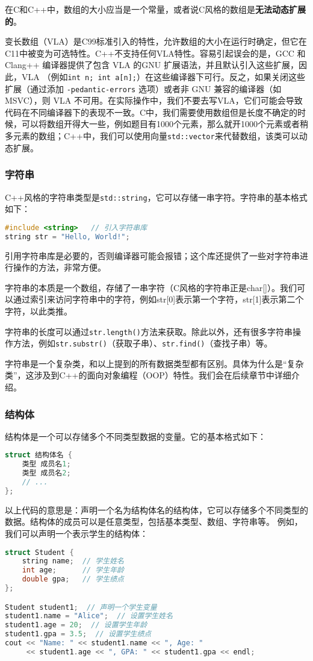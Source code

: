 \documentclass[../main.tex]{subfiles}
\begin{document}
在C和C++中，数组的大小应当是一个常量，或者说C风格的数组是\textbf{无法动态扩展的}。

\begin{caution}
  变长数组（VLA）是C99标准引入的特性，允许数组的大小在运行时确定，但它在C11中被变为可选特性。C++不支持任何VLA特性。容易引起误会的是，GCC 和 Clang++ 编译器提供了包含 VLA 的GNU 扩展语法，并且默认引入这些扩展，因此，VLA （例如\texttt{int n; int a[n];}）在这些编译器下可行。反之，如果关闭这些扩展（通过添加 \texttt{-pedantic-errors} 选项）或者非 GNU 兼容的编译器（如 MSVC），则 VLA 不可用。在实际操作中，我们不要去写VLA，它们可能会导致代码在不同编译器下的表现不一致。C中，我们需要使用数组但是长度不确定的时候，可以将数组开得大一些，例如题目有1000个元素，那么就开1000个元素或者稍多元素的数组；C++中，我们可以使用向量\texttt{std::vector}来代替数组，该类可以动态扩展。
\end{caution}

\subsubsection{字符串}
C++风格的字符串类型是\texttt{std::string}，它可以存储一串字符。字符串的基本格式如下：
\begin{lstlisting}[language=C++]
#include <string>   // 引入字符串库
string str = "Hello, World!";
\end{lstlisting}
引用字符串库是必要的，否则编译器可能会报错；这个库还提供了一些对字符串进行操作的方法，非常方便。

字符串的本质是一个数组，存储了一串字符（C风格的字符串正是char[]）。我们可以通过索引来访问字符串中的字符，例如str[0]表示第一个字符，str[1]表示第二个字符，以此类推。

字符串的长度可以通过\texttt{str.length()}方法来获取。除此以外，还有很多字符串操作方法，例如\texttt{str.substr()}（获取子串）、\texttt{str.find()}（查找子串）等。

字符串是一个复杂类，和以上提到的所有数据类型都有区别。具体为什么是“复杂类”，这涉及到C++的面向对象编程（OOP）特性。我们会在后续章节中详细介绍。

\subsubsection{结构体}
结构体是一个可以存储多个不同类型数据的变量。它的基本格式如下：
\begin{lstlisting}[language=C++]
struct 结构体名 {
    类型 成员名1;
    类型 成员名2;
    // ...
};
\end{lstlisting}
以上代码的意思是：声明一个名为结构体名的结构体，它可以存储多个不同类型的数据。结构体的成员可以是任意类型，包括基本类型、数组、字符串等。
例如，我们可以声明一个表示学生的结构体：
\begin{lstlisting}[language=C++]
struct Student {
    string name;  // 学生姓名
    int age;      // 学生年龄
    double gpa;   // 学生绩点
};

Student student1;  // 声明一个学生变量
student1.name = "Alice";  // 设置学生姓名
student1.age = 20;  // 设置学生年龄
student1.gpa = 3.5;  // 设置学生绩点
cout << "Name: " << student1.name << ", Age: "
     << student1.age << ", GPA: " << student1.gpa << endl;
\end{lstlisting}
\end{document}
